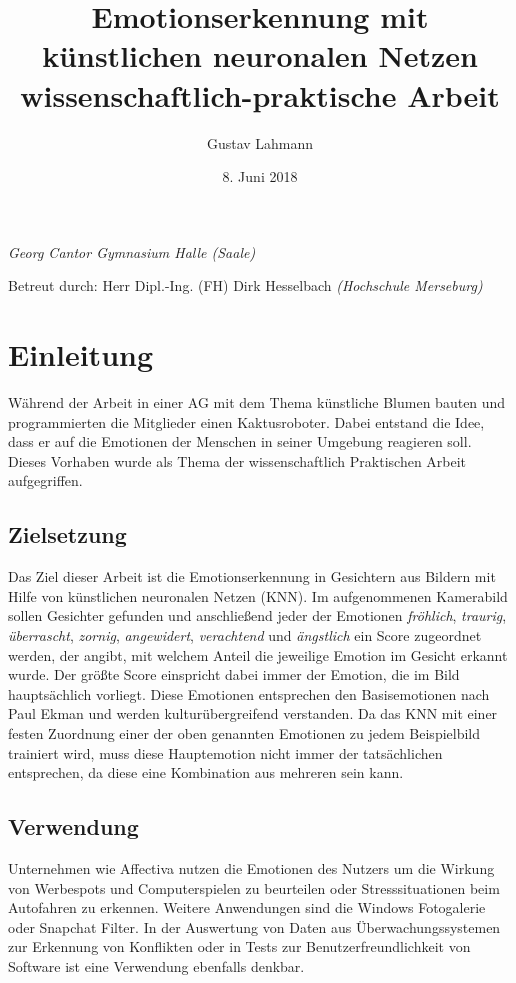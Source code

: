 \documentclass[12pt, a4paper]{article}
\title{\textbf{Emotionserkennung mit künstlichen neuronalen Netzen}\\ {\normalsize wissenschaftlich-praktische Arbeit}}
\author{Gustav Lahmann}
\date{8. Juni 2018}
\begin{document}
\begin{titlepage}
\maketitle
\centering
\small{\textit{Georg Cantor Gymnasium Halle (Saale)}}

\bigskip
\bigskip
\normalsize{Betreut durch: Herr Dipl.-Ing. (FH) Dirk Hesselbach}
\small{\textit{(Hochschule Merseburg)}}
\thispagestyle{empty}
\end{titlepage}


\tableofcontents
\thispagestyle{empty}
\newpage
\setcounter{page}{3}
\section{Einleitung}

Während der Arbeit in einer AG mit dem Thema künstliche Blumen bauten und programmierten die Mitglieder einen Kaktusroboter. Dabei entstand die Idee, dass er auf die Emotionen der Menschen in seiner Umgebung reagieren soll. Dieses Vorhaben wurde als Thema der wissenschaftlich Praktischen Arbeit aufgegriffen.

\subsection{Zielsetzung}

Das Ziel dieser Arbeit ist die Emotionserkennung in Gesichtern aus Bildern mit Hilfe von künstlichen neuronalen Netzen (KNN). Im aufgenommenen Kamerabild sollen Gesichter gefunden und anschließend jeder der Emotionen \textit{fröhlich}, \textit{traurig}, \textit{überrascht}, \textit{zornig}, \textit{angewidert}, \textit{verachtend} und \textit{ängstlich} ein Score zugeordnet werden, der angibt, mit welchem Anteil die jeweilige Emotion im Gesicht erkannt wurde. Der größte Score einspricht dabei immer der Emotion, die im Bild hauptsächlich vorliegt. Diese Emotionen entsprechen den Basisemotionen nach Paul Ekman und werden kulturübergreifend verstanden.\cite{wikipedia:facs} Da das KNN mit einer festen Zuordnung einer der oben genannten Emotionen zu jedem Beispielbild trainiert wird, muss diese Hauptemotion nicht immer der tatsächlichen entsprechen, da diese eine Kombination aus mehreren sein kann.

\subsection{Verwendung}
Unternehmen wie Affectiva nutzen die Emotionen des Nutzers um die Wirkung von Werbespots und Computerspielen zu beurteilen oder Stresssituationen beim Autofahren zu erkennen.\cite{affectiva:web}
Weitere Anwendungen sind die Windows Fotogalerie oder Snapchat Filter. In der Auswertung von Daten aus Überwachungssystemen zur Erkennung von Konflikten oder in Tests zur Benutzerfreundlichkeit von Software ist eine Verwendung ebenfalls denkbar.
\end{document}
